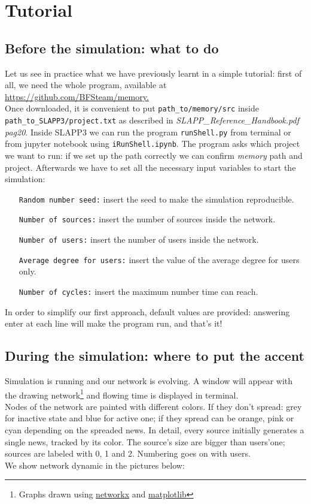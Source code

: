 \section{Tutorial}\label{sec:tutorial}
\subsection{Before the simulation: what to do}\label{subsec:before}
Let us see in practice what we have previously learnt in a simple tutorial:
first of all, we need the whole program, available at
\url{https://github.com/BFSteam/memory.}\\
Once downloaded, it is convenient to put \texttt{path\_to/memory/src} inside
\texttt{path\_to\_SLAPP3/project.txt} as described in
\textit{SLAPP\_Reference\_Handbook.pdf pag20}.
Inside SLAPP3 we can run the program \texttt{runShell.py} from terminal
or from jupyter notebook using \texttt{iRunShell.ipynb}.
The program asks which project we want to run: if we set up the path correctly
we can confirm \textit{memory} path and project.
Afterwards we have to set all the necessary input variables to start
the simulation:
\begin{itemize}
\item[\texttt{Random number seed:}] insert the seed to make the simulation
  reproducible.
\item[\texttt{Number of sources:}]insert the number of sources inside
  the network.
\item[\texttt{Number of users:}]insert the number of users inside the
  network.
\item[\texttt{Average degree for users:}]insert the value of the average
  degree for users only.
\item[\texttt{Number of cycles:}]insert the maximum number time can reach.
\end{itemize}
In order to simplify our first approach, default values are provided:
answering enter at each line will make the program run, and that's it!\\

\subsection{During the simulation: where to put the accent}\label{subsec:during}
Simulation is running and our network is evolving. A window will appear
with the drawing network\footnote{Graphs drawn using
  \href{https://networkx.github.io/}{networkx} and
  \href{https://matplotlib.org/}{matplotlib}}
and flowing time is displayed in terminal. \\
Nodes of the network are painted with different colors. If they don't
spread: grey for inactive state and blue for active one; if they spread
can be orange, pink or cyan depending on the spreaded news.
In detail, every source initially generates a single news, tracked by its
color. The source's size are bigger than users'one; sources are labeled with 0, 1 and 2. Numbering goes on with users.\\
We show network dynamic in the pictures below:

